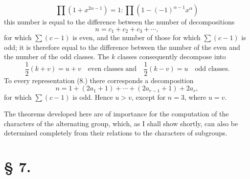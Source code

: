 \documentclass[11pt]{article}
\begin{document}
\[
 \prod(1+x^{2\alpha-1})=1:\prod(1-(-1)^{\alpha-1}x^\alpha)
\]
this number is equal to the difference between the number of decompositions
\begin{equation}\tag{10.}
 n=c_1+c_2+c_3+
\cdots,
\end{equation}
for which $\sum(c-1)$ is even, and the number of those for which $\sum(c-1)$ is odd; it is therefore equal to the difference between the number of the even and the number of the odd classes. The $k$ classes consequently decompose into
\begin{equation}\tag{11.}
 \frac12(k+v)=u+v\quad\text{even classes and}\quad \frac12(k-v)=u\quad\text{odd classes.}
\end{equation}
To every representation (8.) there corresponds a decomposition
\[
 n=1+(2a_1+1)+
\cdots+(2a_{r-1}+1)+2a_r,
\]
for which $\sum(c-1)$ is odd. Hence $u>v$, except for $n=3$, where $u=v$.

The theorems developed here are of importance for the computation of the characters of the alternating group, which, as I shall show shortly, can also be determined completely from their relations to the characters of subgroups.

\section*{§ 7.}
\end{document}
